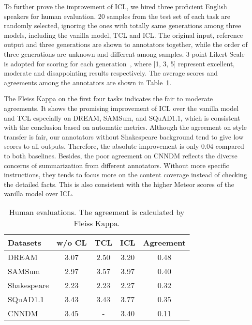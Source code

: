 To further prove the improvement of ICL, we hired three proficient English speakers for human evaluation. 20 samples from the test set of each task are randomly selected, ignoring the ones with totally same generations among three models, including the vanilla model, TCL and ICL. The original input, reference output and three generations are shown to annotators together, while the order of three generations are unknown and different among samples. 3-point Likert Scale is adopted for scoring for each generation~\cite{gliwa2019samsum}, where [1, 3, 5] represent 
excellent, moderate and disappointing results 
respectively. The average scores and agreements 
among the annotators are shown in 
Table~\ref{tab:humaneval}.

The Fleiss Kappa on the first four tasks indicates the fair to moderate agreements. It shows the promising improvement of ICL over the vanilla model and TCL especially on DREAM, SAMSum, and SQuAD1.1, which is consistent with the conclusion based on automatic metrics.
Although the agreement on style transfer is fair, 
our annotators without Shakespeare background 
tend to give low scores to all outputs.
Therefore, the absolute improvement is 
only $0.04$ compared to both baselines.
Besides, the poor agreement on CNNDM reflects the 
diverse concerns of summarization from different 
annotators. Without more specific instructions, they 
tends to focus more on the content coverage instead 
of checking the detailed facts. This is also 
consistent with the higher Meteor scores of the 
vanilla model over ICL.

\begin{table}[th]
	\scriptsize
	\centering
	\begin{tabular}{l|ccc|c}
		\hline
		{Datasets} & {w/o CL} & {TCL} & {ICL} & {Agreement}  \\
		\hline
		DREAM  &3.07 & 2.50&3.20 &0.48 \\
		SAMSum &2.97 &3.57 &3.97 &0.40 \\
		Shakespeare &2.23 &2.23 & 2.27&0.32 \\
		SQuAD1.1 &3.43 & 3.43 &3.77 &0.35 \\
		CNNDM & 3.45 &- &3.40 &0.11 \\
		\hline
	\end{tabular}
	\caption{Human evaluations. The agreement is calculated by Fleiss Kappa.}
	\label{tab:humaneval}
\end{table}




